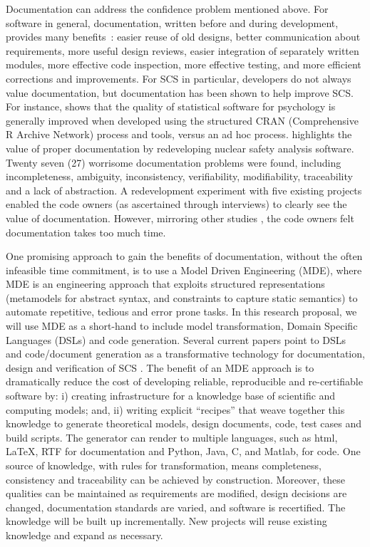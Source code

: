 \documentclass[12pt]{article}
\begin{document}
Documentation can address the confidence problem mentioned above.  For software
in general, documentation, written before and during development, provides many
benefits~\cite{Parnas2010}: easier reuse of old designs, better communication
about requirements, more useful design reviews, easier integration of separately
written modules, more effective code inspection, more effective testing, and
more efficient corrections and improvements.  For SCS in particular, developers
do not always value documentation, but documentation has been shown to help
improve SCS.  For instance, \citet{SmithEtAl2015-SS-TR} shows that the quality
of statistical software for psychology is generally improved when developed
using the structured CRAN (Comprehensive R Archive Network) process and tools,
versus an ad hoc process.  \citet{SmithAndKoothoor2016} highlights the value of
proper documentation by redeveloping nuclear safety analysis software.  Twenty
seven (27) worrisome documentation problems were found, including
incompleteness, ambiguity, inconsistency, verifiability, modifiability,
traceability and a lack of abstraction.  A redevelopment experiment with five
existing projects \citep{SmithJegatheesanAndKelly2016} enabled the code owners
(as ascertained through interviews) to clearly see the value of documentation.
However, mirroring other studies \citep{CarverEtAl2007}, the code owners felt
documentation takes too much time.

One promising approach to gain the benefits of documentation, without the often
infeasible time commitment, is to use a Model Driven Engineering (MDE), where
MDE is an engineering approach that exploits structured representations
(metamodels for abstract syntax, and constraints to capture static semantics) to
automate repetitive, tedious and error prone tasks.  In this research proposal,
we will use MDE as a short-hand to include model transformation, Domain Specific
Languages (DSLs) and code generation.  Several current papers point to DSLs and
code/document generation as a transformative technology for documentation,
design and verification of SCS \citep{JohansonAndHasselbring2018, Smith2018}.
The benefit of an MDE approach is to dramatically reduce the cost of developing
reliable, reproducible and re-certifiable software by: i) creating
infrastructure for a knowledge base of scientific and computing models; and, ii)
writing explicit ``recipes'' that weave together this knowledge to generate
theoretical models, design documents, code, test cases and build scripts. The
generator can render to multiple languages, such as html, LaTeX, RTF for
documentation and Python, Java, C, and Matlab, for code. One source of
knowledge, with rules for transformation, means completeness, consistency and
traceability can be achieved by construction. Moreover, these qualities can be
maintained as requirements are modified, design decisions are changed,
documentation standards are varied, and software is re­certified.  The knowledge
will be built up incrementally.  New projects will reuse existing knowledge and
expand as necessary.
\end{document}
